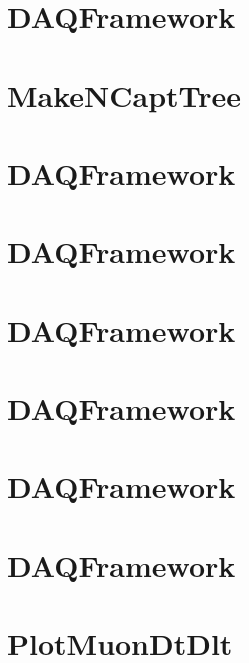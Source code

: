 \let\mypdfximage\pdfximage\def\pdfximage{\immediate\mypdfximage}\documentclass[twoside]{book}
\newcommand{\+}{\discretionary{\mbox{\scriptsize$\hookleftarrow$}}{}{}}
\begin{document}
\chapter{DAQFramework}
\label{md_UserTools_LoadSubTrigger_README}

\chapter{Make\+NCapt\+Tree}
\label{md_UserTools_MakeNCaptTree_README}

\chapter{DAQFramework}
\label{md_UserTools_muechk_README}

\chapter{DAQFramework}
\label{md_UserTools_mufit_sk4_README}

\chapter{DAQFramework}
\label{md_UserTools_NCaptInfo_README}

\chapter{DAQFramework}
\label{md_UserTools_NeutCloudCorrelationCuts_README}

\chapter{DAQFramework}
\label{md_UserTools_ntag_BDT_README}

\chapter{DAQFramework}
\label{md_UserTools_PlotHitTimes_README}

\chapter{Plot\+Muon\+Dt\+Dlt}
\label{md_UserTools_PlotMuonDtDlt_README}

\end{document}
